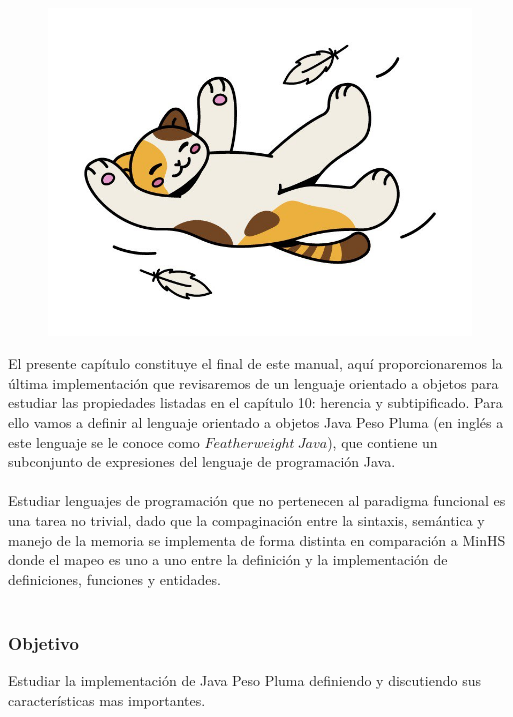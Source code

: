 
\begin{figure}[htbp]
    \centerline{\includegraphics[scale=.4]{assets/11_gatito_cayendo.jpg}}
\end{figure} 
\bigskip

El presente capítulo constituye el final de este manual, aquí proporcionaremos la última implementación que revisaremos de un lenguaje orientado a objetos para estudiar las propiedades listadas en el capítulo 10: herencia y subtipificado.
Para ello vamos a definir al lenguaje orientado a objetos \textsf{Java Peso Pluma} (en inglés a este lenguaje se le conoce como $Featherweight\ Java$), que contiene un subconjunto de expresiones del lenguaje de programación \textsf{Java}.\\\\
Estudiar lenguajes de programación que no pertenecen al paradigma funcional es una tarea no trivial, dado que la compaginación entre la sintaxis, semántica y manejo de la memoria se implementa de forma distinta en comparación a \textsf{MinHS} donde el mapeo es uno a uno entre la definición y la implementación de definiciones, funciones y entidades.\\\\

\subsubsection{Objetivo}
Estudiar la implementación de \textsf{Java Peso Pluma} definiendo y discutiendo sus características mas importantes.\\

